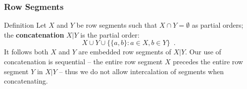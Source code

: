 \begin{frame}
	\frametitle{Row Segments}
	\begin{block}{Definition}
		Let $X$ and $Y$ be row segments such that $X \cap Y = \emptyset$ as partial orders; the \textbf{concatenation} $X | Y$ is the partial order:
    	\begin{equation*}
        	X \cup Y \cup \{ \{ a, b \} : a \in X, b \in Y \} \enspace.
    	\end{equation*}
    	It follows both $X$ and $Y$ are embedded row segments of $X | Y$. Our use of concatenation is sequential -- the entire row segment $X$ precedes the entire row segment $Y$ in $X | Y$ -- thus we do not allow intercalation of segments when concatenating.
	\end{block}
\end{frame}
